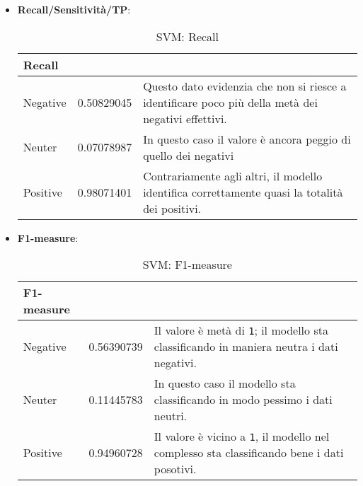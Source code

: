 \begin{itemize}
				\item \textbf{Recall/Sensitività/TP}:
				
				\begin{table}[H]
					\caption{SVM: Recall}
					\label{tab:RecallSVM}
					\centering
					\begin{tabular}{llp{}}
						\toprule 
						\textbf{Recall}	\\
						\midrule
						Negative  & 0.50829045  & Questo dato evidenzia che non si riesce a identificare poco più della metà dei negativi effettivi.\\
						Neuter & 0.07078987 & In questo caso il valore è ancora peggio di quello dei negativi\\
						Positive & 0.98071401 & Contrariamente agli altri, il modello identifica correttamente quasi la totalità dei positivi.\\
						\bottomrule
					\end{tabular}
				\end{table}
			
			\item \textbf{F1-measure}:
			
			\begin{table} [H]
				\caption{SVM: F1-measure}
				\label{tab:F1-measureSVM}
				\centering
				\begin{tabular}{llp{}}
					\toprule 
					\textbf{F1-measure}	\\
					\midrule
					Negative  & 0.56390739  & Il valore è metà di \verb|1|; il modello sta classificando in maniera neutra i dati negativi.\\
					Neuter & 0.11445783 & In questo caso il modello sta classificando in modo pessimo i dati neutri.\\
					Positive & 0.94960728 & Il valore è vicino a \verb|1|, il modello nel complesso sta classificando bene i dati posotivi.\\
					\bottomrule
				\end{tabular}
			\end{table}
				
		\end{itemize}
				
